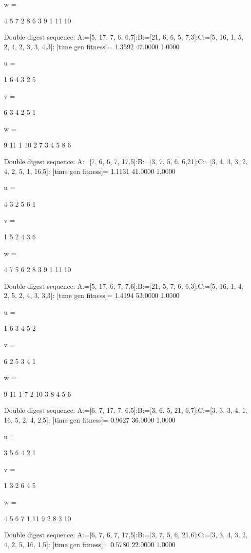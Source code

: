 w =

     4     5     7     2     8     6     3     9     1    11    10

Double digest sequence:
A:=[5, 17, 7, 6, 6,7]:B:=[21, 6, 6, 5, 7,3]:C:=[5, 16, 1, 5, 2, 4, 2, 3, 3, 4,3]:
[time gen fitness]=
    1.3592   47.0000    1.0000


u =

     1     6     4     3     2     5


v =

     6     3     4     2     5     1


w =

     9    11     1    10     2     7     3     4     5     8     6

Double digest sequence:
A:=[7, 6, 6, 7, 17,5]:B:=[3, 7, 5, 6, 6,21]:C:=[3, 4, 3, 3, 2, 4, 2, 5, 1, 16,5]:
[time gen fitness]=
    1.1131   41.0000    1.0000


u =

     4     3     2     5     6     1


v =

     1     5     2     4     3     6


w =

     4     7     5     6     2     8     3     9     1    11    10

Double digest sequence:
A:=[5, 17, 6, 7, 7,6]:B:=[21, 5, 7, 6, 6,3]:C:=[5, 16, 1, 4, 2, 5, 2, 4, 3, 3,3]:
[time gen fitness]=
    1.4194   53.0000    1.0000


u =

     1     6     3     4     5     2


v =

     6     2     5     3     4     1


w =

     9    11     1     7     2    10     3     8     4     5     6

Double digest sequence:
A:=[6, 7, 17, 7, 6,5]:B:=[3, 6, 5, 21, 6,7]:C:=[3, 3, 3, 4, 1, 16, 5, 2, 4, 2,5]:
[time gen fitness]=
    0.9627   36.0000    1.0000


u =

     3     5     6     4     2     1


v =

     1     3     2     6     4     5


w =

     4     5     6     7     1    11     9     2     8     3    10

Double digest sequence:
A:=[6, 7, 6, 7, 17,5]:B:=[3, 7, 5, 6, 21,6]:C:=[3, 3, 4, 3, 2, 4, 2, 5, 16, 1,5]:
[time gen fitness]=
    0.5780   22.0000    1.0000


